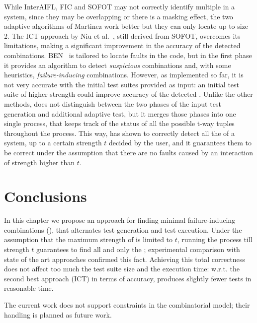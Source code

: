 \begin{tikzborder}{\cite{Gargantini16:validation}}
\begin{tikzborder}{\cite{gargantini_combinatorial_2017}}
\begin{tikzborder}{\cite{garn2019}}
\begin{tikzborder}{\cite{arcaini2019achieving}}
\begin{tikzborder}{}
While InterAIFL, FIC and SOFOT may not correctly identify multiple \mfics in a system, since they may be overlapping or there is a masking effect, the two adaptive algorithms of Martinez work better but they can only locate \mfics up to size 2. The ICT approach by Niu et al.~\cite{Niu2018interleaving}, still derived from SOFOT, overcomes its limitations, making a significant improvement in the accuracy of the detected combinations. BEN~\cite{ghandehari2018combinatorial} is tailored to locate faults in the code, but in the first phase it provides an algorithm to detect \textit{suspicious} combinations and, with some heuristics, \textit{failure-inducing} combinations. However, as implemented so far, it is not very accurate with the initial test suites provided as input: an initial test suite of higher strength could improve accuracy of the detected \mfics. Unlike the other methods, \mix does not distinguish between the two phases of the input test generation and additional adaptive test, but it merges those phases into one single process, that keeps track of the status of all the possible t-way tuples throughout the process. This way, \mix has shown to correctly detect all the \mfics of a system, up to a certain strength $t$ decided by the user, and it guarantees them to be correct under the assumption that there are no faults caused by an interaction of strength higher than $t$.


\end{tikzborder}

\section{Conclusions}\label{sec:conclusions}
In this chapter we propose an approach for finding minimal failure-inducing combinations (\mfics), that alternates test generation and test execution. Under the assumption that the maximum strength of \truemfics is limited to $t$, running the process till strength $t$ guarantees to find all and only the \truemfics; experimental comparison with state of the art approaches confirmed this fact. Achieving this total correctness does not affect too much the test suite size and the execution time: w.r.t. the second best approach (ICT) in terms of accuracy, \mix produces slightly fewer tests in reasonable time.

The current work does not support constraints in the combinatorial model; their handling is planned as future work.


\end{tikzborder}
\end{tikzborder}
\end{tikzborder}
\end{tikzborder}
